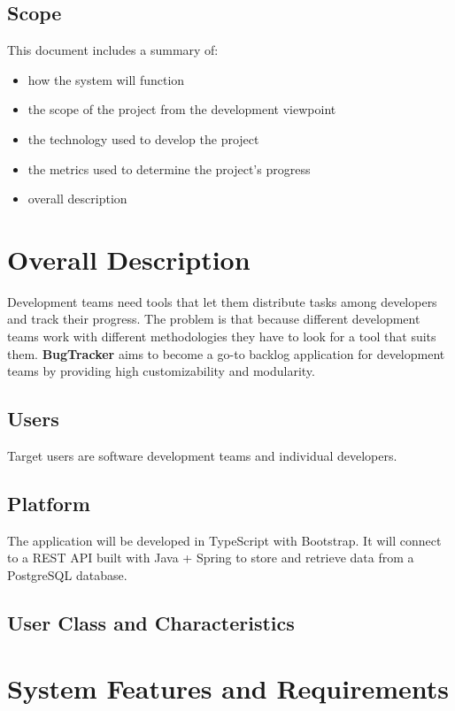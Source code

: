 \documentclass[a4paper]{article}
\newcommand{\appNameBold}{\textbf{BugTracker}}
\begin{document}
    \subsection{Scope}
    This document includes a summary of:
    \begin{itemize}
        \item how the system will function
        \item the scope of the project from the development viewpoint
        \item the technology used to develop the project
        \item the metrics used to determine the project's progress
        \item overall description
    \end{itemize}

    \section{Overall Description}
    Development teams need tools that let them distribute tasks among developers and track their progress.
    The problem is that because different development teams work with different methodologies they have to look for a tool that suits them.
    \appNameBold{} aims to become a go-to backlog application for development teams by providing high customizability and modularity.

    \subsection{Users}
    Target users are software development teams and individual developers.

    \subsection{Platform}
    The application will be developed in TypeScript with Bootstrap. It will connect to a REST API built with Java + Spring to store and retrieve data from a PostgreSQL database.

    \subsection{User Class and Characteristics}

    \section{System Features and Requirements}
\end{document}
